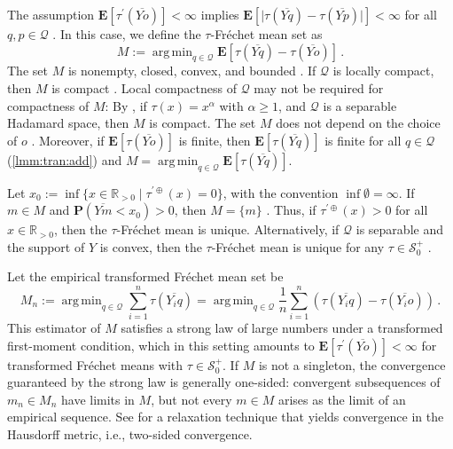 \documentclass{article}
\newcommand*{\mc}[1]{\mathcal{#1}}
\newcommand{\R}{\mathbb{R}}
\newcommand{\Rpp}{\R_{>0}}
\newcommand{\lab}{\left[} %
\newcommand{\rab}{\right]} %
\newcommand{\ab}[1]{\lab #1 \rab} %
\newcommand{\abOf}[1]{\!\ab{#1}} %
\newcommand{\lb}{\left(} %
\newcommand{\rb}{\right)} %
\newcommand{\br}[1]{\lb #1 \rb} %
\newcommand{\absof}[1]{\vert #1 \vert} %
\renewcommand{\Pr}{\mathbf{P}} %
\newcommand{\Prof}[1]{\Pr(#1)}
\newcommand{\E}{\mathbf{E}} %
\newcommand{\Eof}[1]{\E[#1]}
\newcommand{\EOf}[1]{\E\abOf{#1}}
\newcommand{\setByEleInText}[2]{\{#1 \mid #2\}}
\newcommand{\pr}{^\prime}
\newcommand{\eqfs}{\,.}
\DeclareMathOperator*{\argmin}{arg\,min}
\newcommand{\ol}[2]{\overline{#1#2}}
\newcommand{\tran}{\tau}
\newcommand{\dtran}{\tau\pr}
\newcommand{\ddrtran}{\tau^{\prime\oplus}}
\newcommand{\setcciz}{\mc S_0^+}
\begin{document}
The assumption $\Eof{\dtran(\ol Yo)} < \infty$ implies $\Eof{\absof{\tran(\ol Yq)-\tran(\ol Yp)}} < \infty$ for all $q,p\in\mc Q$ \cite[Proposition 3.2]{varinequ}. In this case, we define the $\tran$-Fr\'echet mean set as
\begin{equation}
	M := \argmin_{q\in\mc Q} \EOf{\tran(\ol Yq)-\tran(\ol Yo)}
	\eqfs
\end{equation}
The set $M$ is nonempty, closed, convex, and bounded \cite[Proposition 5.2]{varinequ}. If $\mc Q$ is locally compact, then $M$ is compact \cite[Remark 5.3]{varinequ}. 
Local compactness of $\mc Q$ may not be required for compactness of $M$: By \cite[Example 2.5 and Corollary 3.10]{jaffe2024}, if $\tran(x) = x^\alpha$ with $\alpha \geq 1$, and $\mc Q$ is a separable Hadamard space, then $M$ is compact.
The set $M$ does not depend on the choice of $o$ \cite[Proposition 5.2]{varinequ}.
Moreover, if $\Eof{\tran(\ol Yo)}$ is finite, then $\Eof{\tran(\ol Yq)}$ is finite for all $q\in\mc Q$ (\cref{lmm:tran:add}) and $M = \argmin_{q\in\mc Q} \Eof{\tran(\ol Yq)}$.

Let $x_0 := \inf\setByEleInText{x\in\Rpp}{\ddrtran(x) = 0}$, with the convention $\inf\emptyset = \infty$. If $m \in M$ and $\Prof{\ol Ym < x_0} > 0$, then $M= \{m\}$ \cite[Corollary 5.7]{varinequ}. Thus, if $\ddrtran(x) > 0$ for all $x\in\Rpp$, then the $\tran$-Fr\'echet mean is unique. Alternatively, if $\mc Q$ is separable and the support of $Y$ is convex, then the $\tran$-Fr\'echet mean is unique for any $\tran\in\setcciz$ \cite[Corollary 6.14]{varinequ}.

Let the empirical transformed Fr\'echet mean set be
\begin{equation}
	M_n := \argmin_{q\in\mc Q} \sum_{i=1}^n \tran(\ol {Y_i}q) = \argmin_{q\in\mc Q} \frac1n \sum_{i=1}^n \br{\tran(\ol {Y_i}q)-\tran(\ol {Y_i}o)}
	\eqfs
\end{equation}
This estimator of $M$ satisfies a strong law of large numbers \cite{schoetz22, Evans2024, jaffe2024} under a transformed first-moment condition, which in this setting amounts to $\Eof{\dtran(\ol Yo)} < \infty$ for transformed Fr\'echet means with $\tran \in \setcciz$. If $M$ is not a singleton, the convergence guaranteed by the strong law is generally one-sided: convergent subsequences of $m_n \in M_n$ have limits in $M$, but not every $m \in M$ arises as the limit of an empirical sequence. See \cite{Blanchard2025} for a relaxation technique that yields convergence in the Hausdorff metric, i.e., two-sided convergence.
%
%
%
\end{document}
